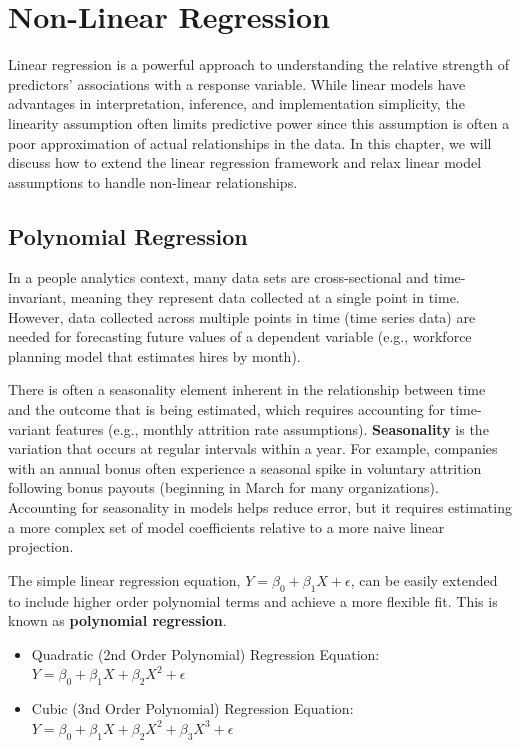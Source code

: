 \documentclass[
]{book}
\providecommand{\tightlist}{%
  \setlength{\itemsep}{0pt}\setlength{\parskip}{0pt}}
\begin{document}
\hypertarget{lme}{%
\chapter{Non-Linear Regression}\label{lme}}

Linear regression is a powerful approach to understanding the relative strength of predictors' associations with a response variable. While linear models have advantages in interpretation, inference, and implementation simplicity, the linearity assumption often limits predictive power since this assumption is often a poor approximation of actual relationships in the data. In this chapter, we will discuss how to extend the linear regression framework and relax linear model assumptions to handle non-linear relationships.

\hypertarget{polynomial-regression}{%
\section{Polynomial Regression}\label{polynomial-regression}}

In a people analytics context, many data sets are cross-sectional and time-invariant, meaning they represent data collected at a single point in time. However, data collected across multiple points in time (time series data) are needed for forecasting future values of a dependent variable (e.g., workforce planning model that estimates hires by month).

There is often a seasonality element inherent in the relationship between time and the outcome that is being estimated, which requires accounting for time-variant features (e.g., monthly attrition rate assumptions). \textbf{Seasonality} is the variation that occurs at regular intervals within a year. For example, companies with an annual bonus often experience a seasonal spike in voluntary attrition following bonus payouts (beginning in March for many organizations). Accounting for seasonality in models helps reduce error, but it requires estimating a more complex set of model coefficients relative to a more naive linear projection.

The simple linear regression equation, \(Y = \beta_0 + \beta_1 X + \epsilon\), can be easily extended to include higher order polynomial terms and achieve a more flexible fit. This is known as \textbf{polynomial regression}.

\begin{itemize}
\tightlist
\item
  Quadratic (2nd Order Polynomial) Regression Equation: \(Y = \beta_0 + \beta_1 X + \beta_2 X^2 + \epsilon\)
\item
  Cubic (3nd Order Polynomial) Regression Equation: \(Y = \beta_0 + \beta_1 X + \beta_2 X^2 + \beta_3 X^3 + \epsilon\)
\end{itemize}
\end{document}
